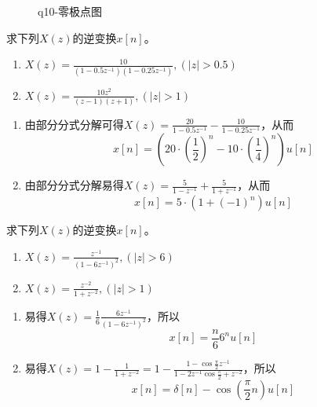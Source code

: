 \documentclass[answers]{exam}  %
\begin{document}
\begin{questions}
\begin{figure}[!h]
	\label{Figure:q10}
	\caption{q10-零极点图}
\end{figure}
\question 求下列$X(z)$的逆变换$x[n]$。
\begin{enumerate}[(1)]
\item $X(z)=\frac{10}{(1-0.5z^{-1})(1-0.25z^{-1})},(|z|>0.5)$
\item $X(z)=\frac{10z^2}{(z-1)(z+1)},(|z|>1)$
\end{enumerate}
\begin{solution}
\begin{enumerate}[(1)]
	\item 由部分分式分解可得$X(z)=\frac{20}{1-0.5z^{-1}}-\frac{10}{1-0.25z^{-1}}$，从而$$x[n]=(20\cdot(\frac{1}{2})^n-10\cdot(\frac{1}{4})^n)u[n]$$
	\item 由部分分式分解易得$X(z)=\frac{5}{1-z^{-1}}+\frac{5}{1+z^{-1}}$，从而$$x[n]=5\cdot(1+(-1)^n)u[n]$$
\end{enumerate}
\end{solution}

\question 求下列$X(z)$的逆变换$x[n]$。
\begin{enumerate}[(1)]
\item $X(z)=\frac{z^{-1}}{(1-6z^{-1})^2},(|z|>6)$
\item $X(z)=\frac{z^{-2}}{1+z^{-2}},(|z|>1)$
\end{enumerate}
\begin{solution}
\begin{enumerate}[(1)]
	\item 易得$X(z)=\frac{1}{6}\frac{6z^{-1}}{(1-6z^{-1})^2}$，所以$$x[n]=\frac{n}{6}6^nu[n]$$
	\item 易得$X(z)=1-\frac{1}{1+z^{-2}}=1-\frac{1-\cos\frac{\pi}{2}z^{-1}}{1-2z^{-1}\cos\frac{\pi}{2}+z^{-2}}$，所以$$x[n]=\delta[n]-\cos(\frac{\pi}{2}n)u[n]$$
\end{enumerate}
\end{solution}


\end{questions}
\end{document}
